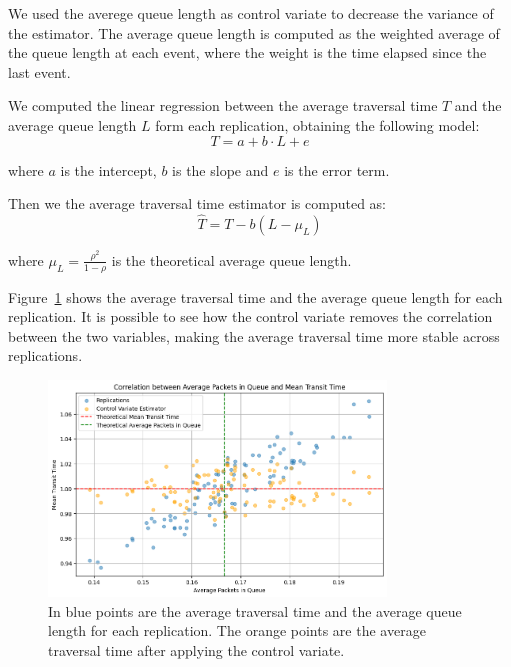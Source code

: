 \documentclass[a4paper]{article}
\begin{document}
We used the averege queue length as control variate to decrease the variance of the estimator. The average queue length is computed as the weighted average of the queue length at each event, where the weight is the time elapsed since the last event.

We computed the linear regression between the average traversal time $T$ and the average queue length
$L$ form each replication, obtaining the following model:
\begin{equation}
  T = a + b \cdot L + e
\end{equation}

where $a$ is the intercept, $b$ is the slope and $e$ is the error term.

Then we the average traversal time estimator is computed as:
\begin{equation}
  \hat{T} = T - b (
    L - \mu_L
  )
\end{equation}

where $\mu_L = \frac{\rho^2}{1 - \rho}$ is the theoretical average queue length.

Figure~\ref{fig:e2p2-corr} shows the average traversal time and the average queue length for each replication. It is possible to see how the control variate removes the correlation between the two variables, making the average traversal time more stable across replications.

\begin{figure}[htbp]
  \centering
  \includegraphics[width=0.8\textwidth]{images/ex2_p2_corr.png}
  \caption{
    In blue points are the average traversal time and the average queue length for each replication.
    The orange points are the average traversal time after applying the control variate.
  }\label{fig:e2p2-corr}
\end{figure}
\end{document}
